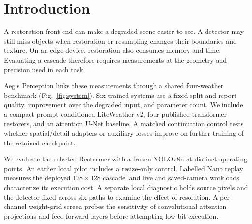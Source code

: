 \section{Introduction}
A restoration front end can make a degraded scene easier to see. A detector may still miss objects when restoration or resampling changes their boundaries and texture. On an edge device, restoration also consumes memory and time. Evaluating a cascade therefore requires measurements at the geometry and precision used in each task.

Aegis Perception links these measurements through a shared four-weather benchmark (Fig.~\ref{fig:system}). Six trained systems use a fixed split and report quality, improvement over the degraded input, and parameter count. We include a compact prompt-conditioned LiteWeather v2, four published transformer restorers, and an attention U-Net baseline. A matched continuation control tests whether spatial/detail adapters or auxiliary losses improve on further training of the retained checkpoint.

We evaluate the selected Restormer with a frozen YOLOv8n at distinct operating points. An earlier local pilot includes a resize-only control. Labelled Nano replay measures the deployed $128\times128$ cascade, and live and saved-camera workloads characterize its execution cost. A separate local diagnostic holds source pixels and the detector fixed across six paths to examine the effect of resolution. A per-channel weight-grid screen probes the sensitivity of convolutional attention projections and feed-forward layers before attempting low-bit execution.
